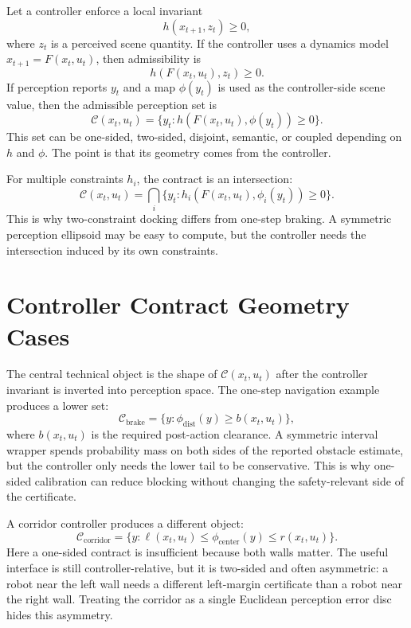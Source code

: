 \documentclass{article}
\newcommand{\x}{x}
\newcommand{\uvec}{u}
\newcommand{\contract}{\mathcal{C}}
\begin{document}
Let a controller enforce a local invariant
\begin{equation}
    h(\x_{t+1}, z_t)\geq 0,
\end{equation}
where $z_t$ is a perceived scene quantity. If the controller uses a dynamics model $\x_{t+1}=F(\x_t,\uvec_t)$, then admissibility is
\begin{equation}
    h(F(\x_t,\uvec_t), z_t)\geq 0.
\end{equation}
If perception reports $y_t$ and a map $\phi(y_t)$ is used as the controller-side scene value, then the admissible perception set is
\begin{equation}
    \contract(\x_t,\uvec_t)
    =
    \{y_t:h(F(\x_t,\uvec_t),\phi(y_t))\geq 0\}.
\end{equation}
This set can be one-sided, two-sided, disjoint, semantic, or coupled depending on $h$ and $\phi$. The point is that its geometry comes from the controller.

For multiple constraints $h_i$, the contract is an intersection:
\begin{equation}
    \contract(\x_t,\uvec_t)
    =
    \bigcap_i
    \{y_t:h_i(F(\x_t,\uvec_t),\phi_i(y_t))\geq 0\}.
\end{equation}
This is why two-constraint docking differs from one-step braking. A symmetric perception ellipsoid may be easy to compute, but the controller needs the intersection induced by its own constraints.

\section{Controller Contract Geometry Cases}

The central technical object is the shape of $\contract(\x_t,\uvec_t)$ after the controller invariant is inverted into perception space. The one-step navigation example produces a lower set:
\begin{equation}
    \contract_{\mathrm{brake}}
    =
    \{y:\phi_{\mathrm{dist}}(y)\geq b(\x_t,\uvec_t)\},
\end{equation}
where $b(\x_t,\uvec_t)$ is the required post-action clearance. A symmetric interval wrapper spends probability mass on both sides of the reported obstacle estimate, but the controller only needs the lower tail to be conservative. This is why one-sided calibration can reduce blocking without changing the safety-relevant side of the certificate.

A corridor controller produces a different object:
\begin{equation}
    \contract_{\mathrm{corridor}}
    =
    \{y:
    \ell(\x_t,\uvec_t)\leq \phi_{\mathrm{center}}(y)
    \leq r(\x_t,\uvec_t)\}.
\end{equation}
Here a one-sided contract is insufficient because both walls matter. The useful interface is still controller-relative, but it is two-sided and often asymmetric: a robot near the left wall needs a different left-margin certificate than a robot near the right wall. Treating the corridor as a single Euclidean perception error disc hides this asymmetry.
\end{document}
